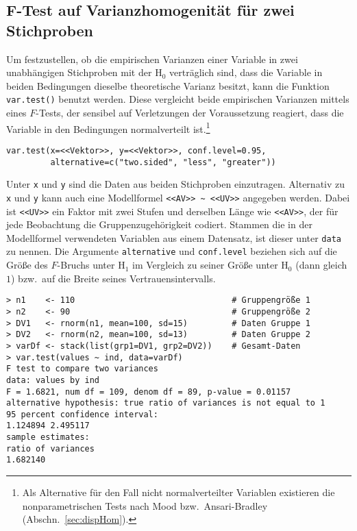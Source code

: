 \subsection[\texorpdfstring{$F$}{F}-Test auf Varianzhomogenität für zwei Stichproben]{$\bm{F}$-Test auf Varianzhomogenität für zwei Stichproben}

Um festzustellen, ob die empirischen Varianzen einer Variable in zwei unabhängigen Stichproben mit der $\text{H}_{0}$ verträglich sind, dass die Variable in beiden Bedingungen dieselbe theoretische Varianz besitzt, kann die Funktion \lstinline!var.test()! benutzt werden. Diese vergleicht beide empirischen Varianzen mittels eines $F$-Tests, der sensibel auf Verletzungen der Voraussetzung reagiert, dass die Variable in den Bedingungen normalverteilt ist.\footnote{Als Alternative für den Fall nicht normalverteilter Variablen existieren die nonparametrischen Tests nach Mood bzw.\ Ansari-Bradley (Abschn.\ \ref{sec:dispHom}).}
\begin{lstlisting}
var.test(x=<<Vektor>>, y=<<Vektor>>, conf.level=0.95,
         alternative=c("two.sided", "less", "greater"))
\end{lstlisting}

Unter \lstinline!x! und \lstinline!y! sind die Daten aus beiden Stichproben einzutragen. Alternativ zu \lstinline!x! und \lstinline!y! kann auch eine Modellformel \lstinline!<<AV>> ~ <<UV>>! angegeben werden. Dabei ist \lstinline!<<UV>>! ein Faktor mit zwei Stufen und derselben Länge wie \lstinline!<<AV>>!, der für jede Beobachtung die Gruppenzugehörigkeit codiert. Stammen die in der Modellformel verwendeten Variablen aus einem Datensatz, ist dieser unter \lstinline!data! zu nennen. Die Argumente \lstinline!alternative! und \lstinline!conf.level! beziehen sich auf die Größe des $F$-Bruchs unter $\text{H}_{1}$ im Vergleich zu seiner Größe unter $\text{H}_{0}$ (dann gleich $1$) bzw.\ auf die Breite seines Vertrauensintervalls.
\begin{lstlisting}
> n1    <- 110                                # Gruppengröße 1
> n2    <- 90                                 # Gruppengröße 2
> DV1   <- rnorm(n1, mean=100, sd=15)         # Daten Gruppe 1
> DV2   <- rnorm(n2, mean=100, sd=13)         # Daten Gruppe 2
> varDf <- stack(list(grp1=DV1, grp2=DV2))    # Gesamt-Daten
> var.test(values ~ ind, data=varDf)
F test to compare two variances
data: values by ind
F = 1.6821, num df = 109, denom df = 89, p-value = 0.01157
alternative hypothesis: true ratio of variances is not equal to 1
95 percent confidence interval:
1.124894 2.495117
sample estimates:
ratio of variances
1.682140
\end{lstlisting}

